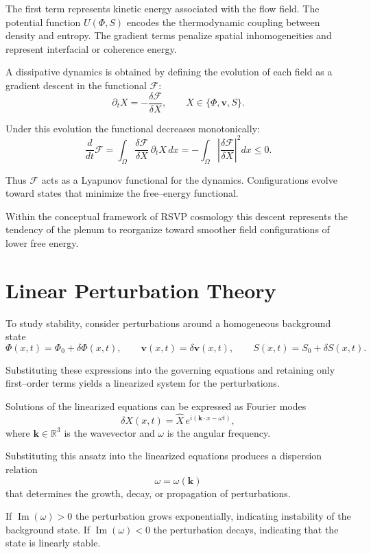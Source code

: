 \documentclass[11pt, openany]{book}
\theoremstyle{plain}
\theoremstyle{definition}
\theoremstyle{remark}
\begin{document}
The first term represents kinetic energy associated with the flow
field.  The potential function $U(\Phi,S)$ encodes the thermodynamic
coupling between density and entropy.  The gradient terms penalize
spatial inhomogeneities and represent interfacial or coherence energy.

A dissipative dynamics is obtained by defining the evolution of each
field as a gradient descent in the functional $\mathcal{F}$:
\[
\partial_t X
=
-\frac{\delta\mathcal{F}}{\delta X},
\qquad
X\in\{\Phi,\mathbf{v},S\}.
\]

Under this evolution the functional decreases monotonically:
\[
\frac{d}{dt}\mathcal{F}
=
\int_\Omega
\frac{\delta\mathcal{F}}{\delta X}\,\partial_t X\,dx
=
-\int_\Omega
\left|
\frac{\delta\mathcal{F}}{\delta X}
\right|^2 dx
\le 0.
\]

Thus $\mathcal{F}$ acts as a Lyapunov functional for the dynamics.
Configurations evolve toward states that minimize the free–energy
functional.

Within the conceptual framework of RSVP cosmology this descent
represents the tendency of the plenum to reorganize toward smoother
field configurations of lower free energy.

\section{Linear Perturbation Theory}

To study stability, consider perturbations around a homogeneous
background state
\[
\Phi(x,t)=\Phi_0+\delta\Phi(x,t),
\qquad
\mathbf{v}(x,t)=\delta\mathbf{v}(x,t),
\qquad
S(x,t)=S_0+\delta S(x,t).
\]

Substituting these expressions into the governing equations and
retaining only first–order terms yields a linearized system for the
perturbations.

Solutions of the linearized equations can be expressed as Fourier modes
\[
\delta X(x,t)
=
\hat{X}\,e^{i(\mathbf{k}\cdot x-\omega t)},
\]
where $\mathbf{k}\in\mathbb{R}^3$ is the wavevector and $\omega$ is the
angular frequency.

Substituting this ansatz into the linearized equations produces a
dispersion relation
\[
\omega=\omega(\mathbf{k})
\]
that determines the growth, decay, or propagation of perturbations.

If $\operatorname{Im}(\omega)>0$ the perturbation grows exponentially,
indicating instability of the background state.  If
$\operatorname{Im}(\omega)<0$ the perturbation decays, indicating that
the state is linearly stable.
\end{document}
